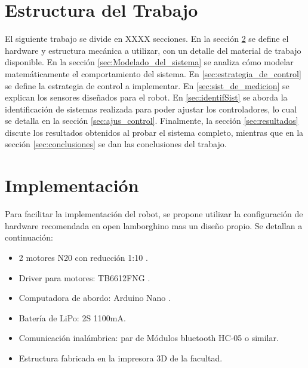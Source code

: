 \documentclass[10pt,conference,a4paper,onecolumn]{article}%
\begin{document}
\section{Estructura del Trabajo}
El siguiente trabajo se divide en {\color{red}XXXX secciones}. En la sección \ref{sec:implementacion} se define el hardware y estructura mecánica a utilizar, con un detalle del material de trabajo disponible. En la sección \ref{sec:Modelado_del_sistema} se analiza cómo modelar matemáticamente el comportamiento del sistema. En  \ref{sec:estrategia_de_control} se define la estrategia de control a implementar. En \ref{sec:sist_de_medicion} se explican los sensores diseñados para el robot. En \ref{sec:identifSist} se aborda la identificación de sistemas realizada para poder ajustar los controladores, lo cual se detalla en la sección \ref{sec:ajus_control}. Finalmente, la sección \ref{sec:resultados} discute los resultados obtenidos al probar el sistema completo, mientras que en la sección \ref{sec:conclusiones} se dan las conclusiones del trabajo.

\section{Implementación}
\label{sec:implementacion}
Para facilitar la implementación del robot, se propone utilizar la configuración de hardware recomendada en open lamborghino mas un diseño propio. Se detallan a continuación:
\begin{itemize}
\item 2 motores N20 con reducción 1:10 \cite{motores}. 
\item Driver para motores: TB6612FNG \cite{puenteH}.
\item Computadora de abordo: Arduino Nano \cite{arduinoNano}.
\item Batería de LiPo: 2S 1100mA.
\item Comunicación inalámbrica: par de Módulos bluetooth HC-05 o similar.  
\item Estructura fabricada en la impresora 3D de la facultad.

\end{itemize}
\end{document}
